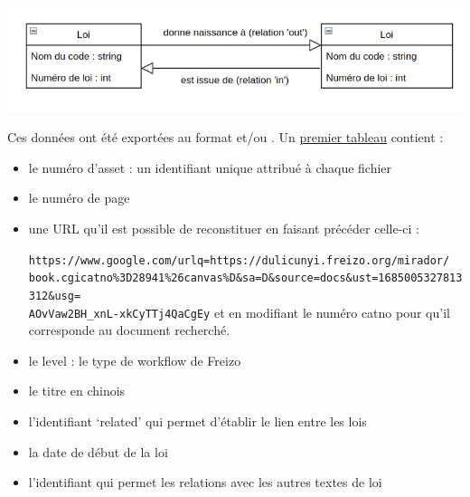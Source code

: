  \noindent \includegraphics[width=\textwidth]{images/image5.png}

 Ces données ont été exportées au format \csv et/ou \tsv. Un \href{https://sharedocs.huma-num.fr/wl/?id=yHHcUPKWyusazIZqWVLgtbZI7J65OaLA&path=Export_Freizo%2Fgenyuan%20test.xlsx&mode=grid}{premier tableau} contient : 
 \begin{itemize}
     \item le numéro d’asset : un identifiant unique attribué à chaque fichier
    \item  le numéro de page
    \item  une URL qu’il est possible de reconstituer en faisant précéder celle-ci : 
    
    \small \texttt{https://www.google.com/urlq=https://dulicunyi.freizo.org/mirador/ \\book.cgicatno\%3D28941\%26canvas\%D\&sa=D\&source=docs\&ust=1685005327813312\&usg= \\ AOvVaw2BH\_xnL-xkCyTTj4QaCgEy} 
    et en modifiant le numéro catno pour qu’il corresponde au document recherché.
    \item le level : le type de workflow de Freizo
    \item  le titre en chinois
    \item  l’identifiant ‘related’ qui permet d’établir le lien entre les lois
    \item  la date de début de la loi
    \item  l’identifiant qui permet les relations avec les autres textes de loi
 \end{itemize}

